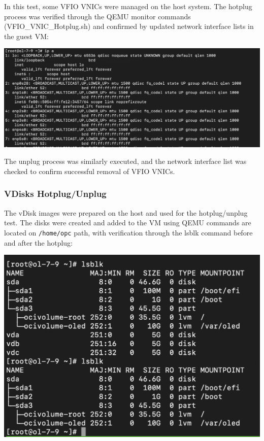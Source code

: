 In this test, some VFIO VNICs were managed on the host system. The hotplug process was verified through the QEMU monitor commands (VFIO\_VNIC\_Hotplug.sh) and confirmed by updated network interface lists in the guest VM:

\begin{center}
    \centering
    \includegraphics[width=\textwidth]{Images/ip a after VNIC Hotplug 2.png}
    \label{fig}
\end{center}

The unplug process was similarly executed, and the network interface list was checked to confirm successful removal of VFIO VNICs.

\subsubsection[VDisks Hotplug/Unplug]{VDisks Hotplug/Unplug}
The vDisk images were prepared on the host and used for the hotplug/unplug test. The disks were created and added to the VM using QEMU commands are located on \texttt{/home/opc} path, with verification through the lsblk command before and after the hotplug:

\begin{center}
    \centering
    \includegraphics[width=\textwidth]{Images/lsblk after hotplug and after ungplug.png}
    \label{fig}
\end{center}

